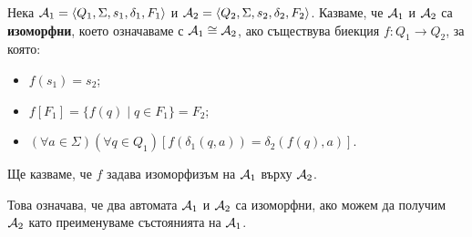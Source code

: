 \begin{dfn}
  Нека $\mathcal{A}_1 = \langle{Q_1,\Sigma,s_1,\delta_1,F_1}\rangle$ и $\mathcal{A}_2 = \langle{Q_2,\Sigma,s_2,\delta_2,F_2}\rangle$.
  Казваме, че $\mathcal{A}_1$ и $\mathcal{A}_2$ са {\bf изоморфни}, което означаваме с $\mathcal{A}_1 \cong \mathcal{A}_2$, ако
  съществува биекция $f: Q_1\to Q_2$, за която:
  \begin{itemize}
  \item
    $f(s_1) = s_2$;
  \item
    $f[F_1] = \{f(q)\mid q\in F_1\} = F_2$;
  \item
    $(\forall a\in\Sigma)(\forall q\in Q_1)[f(\delta_1(q,a)) = \delta_2(f(q),a)]$.
  \end{itemize}
  Ще казваме, че $f$ задава изоморфизъм на $\mathcal{A}_1$ върху $\mathcal{A}_2$.
\end{dfn}

Това означава, че два автомата $\mathcal{A}_1$ и $\mathcal{A}_2$ са изоморфни, ако можем да получим $\mathcal{A}_2$
като преименуваме състоянията на $\mathcal{A}_1$.

